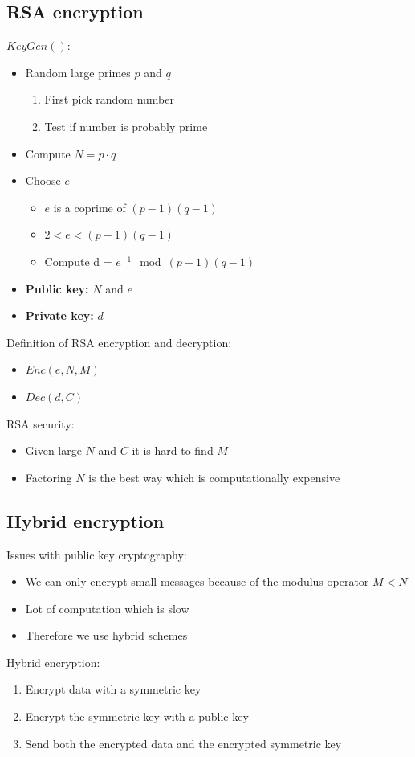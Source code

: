 \documentclass[12pt,a4paper]{article}
\begin{document}
\subsection{RSA encryption}
$KeyGen()$:
\begin{itemize}
    \item Random large primes $p$ and $q$
    \begin{enumerate}
        \item First pick random number 
        \item Test if number is probably prime
    \end{enumerate}
    \item Compute $N = p \cdot q$
    \item Choose $e$
    \begin{itemize}
        \item $e$ is a coprime of $(p-1)(q-1)$
        \item $2 < e < (p-1)(q-1)$
        \item Compute d = $e^{-1} \mod (p-1)(q-1)$
    \end{itemize}
    \item \textbf{Public key:} $N$ and $e$
    \item \textbf{Private key:} $d$
\end{itemize}
Definition of RSA encryption and decryption:
\begin{itemize}
    \item $Enc(e, N, M)$
    \item $Dec(d, C)$
\end{itemize}

RSA security:
\begin{itemize}
    \item Given large $N$ and $C$ it is hard to find $M$
    \item Factoring $N$ is the best way which is computationally expensive
\end{itemize}

\subsection{Hybrid encryption}
Issues with public key cryptography:
\begin{itemize}
    \item We can only encrypt small messages because of the modulus operator $M < N$
    \item Lot of computation which is slow
    \item Therefore we use hybrid schemes
\end{itemize}
Hybrid encryption:
\begin{enumerate}
    \item Encrypt data with a symmetric key
    \item Encrypt the symmetric key with a public key
    \item Send both the encrypted data and the encrypted symmetric key
\end{enumerate}
\end{document}
